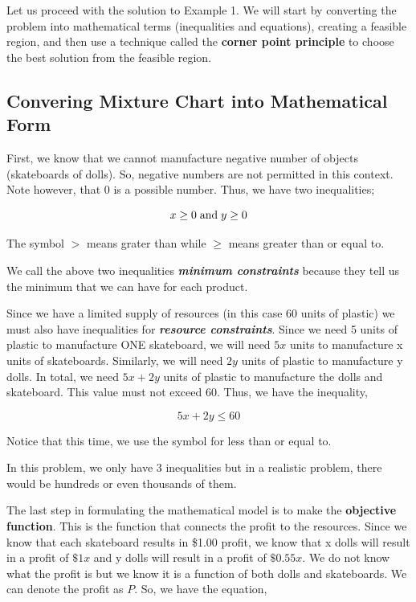 \documentclass[
  letterpaper,
  DIV=11,
  numbers=noendperiod]{scrreprt}
\begin{document}
Let us proceed with the solution to Example 1. We will start by
converting the problem into mathematical terms (inequalities and
equations), creating a feasible region, and then use a technique called
the \textbf{corner point principle} to choose the best solution from the
feasible region.

\hypertarget{convering-mixture-chart-into-mathematical-form}{%
\subsection{Convering Mixture Chart into Mathematical
Form}\label{convering-mixture-chart-into-mathematical-form}}

First, we know that we cannot manufacture negative number of objects
(skateboards of dolls). So, negative numbers are not permitted in this
context. Note however, that 0 is a possible number. Thus, we have two
inequalities;

\[x \ge 0 \hspace{.04in} \text{and} \hspace{.04in} y \ge 0\]

The symbol \(>\) means grater than while \(\ge\) means greater than or
equal to.

We call the above two inequalities \textbf{\emph{minimum constraints}}
because they tell us the minimum that we can have for each product.

Since we have a limited supply of resources (in this case 60 units of
plastic) we must also have inequalities for \textbf{\emph{resource
constraints}}. Since we need 5 units of plastic to manufacture ONE
skateboard, we will need \(5x\) units to manufacture x units of
skateboards. Similarly, we will need \(2y\) units of plastic to
manufacture y dolls. In total, we need \(5x+2y\) units of plastic to
manufacture the dolls and skateboard. This value must not exceed 60.
Thus, we have the inequality,

\[5x+2y\le60\]

Notice that this time, we use the symbol for less than or equal to.

In this problem, we only have 3 inequalities but in a realistic problem,
there would be hundreds or even thousands of them.

The last step in formulating the mathematical model is to make the
\textbf{objective function}. This is the function that connects the
profit to the resources. Since we know that each skateboard results in
\$1.00 profit, we know that x dolls will result in a profit of \(\$1x\)
and y dolls will result in a profit of \(\$0.55x\). We do not know what
the profit is but we know it is a function of both dolls and
skateboards. We can denote the profit as \(P\). So, we have the
equation,
\end{document}
